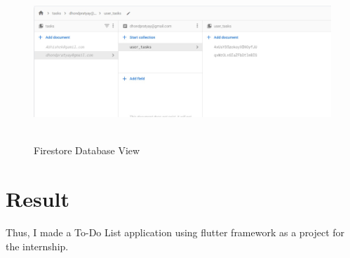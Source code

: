 \begin{figure}[h]
  \begin{center}
   \includegraphics[height=60mm]{Images & Logos/theme/CH_08_database.jpeg}
  \end{center}
  \caption{Firestore Database View}
\end{figure}  

\section{Result}
Thus, I made a To-Do List application using flutter framework as a project for the internship.


